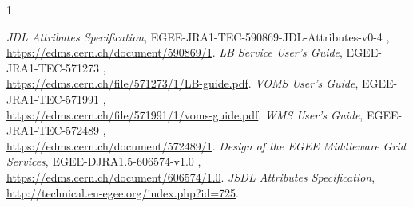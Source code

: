 \documentclass{egee}
\begin{document}
\begin{thebibliography}1


\emph{JDL Attributes Specification}, EGEE-JRA1-TEC-590869-JDL-Attributes-v0-4 , \\ \url{https://edms.cern.ch/document/590869/1}.
\emph{LB Service User's Guide}, EGEE-JRA1-TEC-571273 , \\ \url{https://edms.cern.ch/file/571273/1/LB-guide.pdf}.
\emph{VOMS User's Guide}, EGEE-JRA1-TEC-571991 , \\ \url{https://edms.cern.ch/file/571991/1/voms-guide.pdf}.
\emph{WMS User's Guide}, EGEE-JRA1-TEC-572489 , \\ \url{https://edms.cern.ch/document/572489/1}.
\emph{Design of the EGEE Middleware Grid Services}, EGEE-DJRA1.5-606574-v1.0 , \\ \url{https://edms.cern.ch/document/606574/1.0}.
\emph{JSDL Attributes Specification}, \\ \url{http://technical.eu-egee.org/index.php?id=725}.
\end{thebibliography}

\clearpage

\appendix
\end{document}
